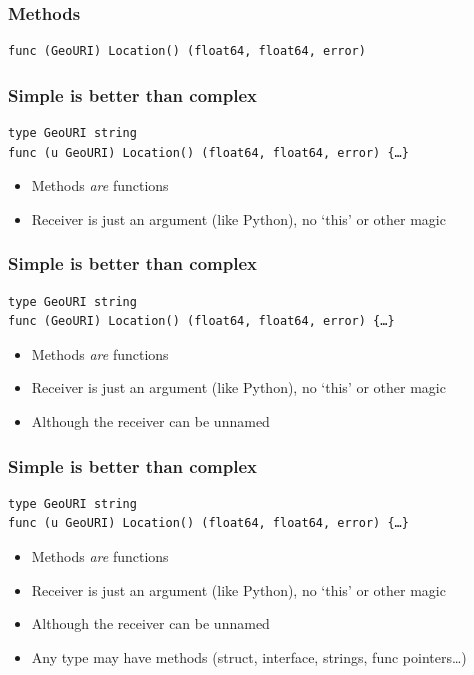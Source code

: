 \documentclass[xelatex,aspectratio=169]{beamer}
\begin{document}
{
\renewcommand{\fcolorbox}[4][]{#4}
\begin{frame}[fragile]
	\frametitle{Methods}
\begin{verbatim}
func (GeoURI) Location() (float64, float64, error)
\end{verbatim}
\end{frame}

\begin{frame}[fragile]
	\frametitle{Simple is better than complex}
\begin{verbatim}
type GeoURI string
func (u GeoURI) Location() (float64, float64, error) {…}
\end{verbatim}
\begin{itemize}[<+(1)->]
	\item Methods \emph{are} functions
	\item Receiver is just an argument (like Python), no `this' or other magic
\end{itemize}
\end{frame}
\begin{frame}[fragile]
	\frametitle{Simple is better than complex}
\begin{verbatim}
type GeoURI string
func (GeoURI) Location() (float64, float64, error) {…}
\end{verbatim}
\begin{itemize}
	\item Methods \emph{are} functions
	\item Receiver is just an argument (like Python), no `this' or other magic
	\item Although the receiver can be unnamed
\end{itemize}
\end{frame}
\begin{frame}[fragile]
	\frametitle{Simple is better than complex}
\begin{verbatim}
type GeoURI string
func (u GeoURI) Location() (float64, float64, error) {…}
\end{verbatim}
\begin{itemize}
	\item Methods \emph{are} functions
	\item Receiver is just an argument (like Python), no `this' or other magic
	\item Although the receiver can be unnamed
	\item Any type may have methods (struct, interface, strings, func pointers\ldots)
\end{itemize}
\end{frame}

}
\end{document}
